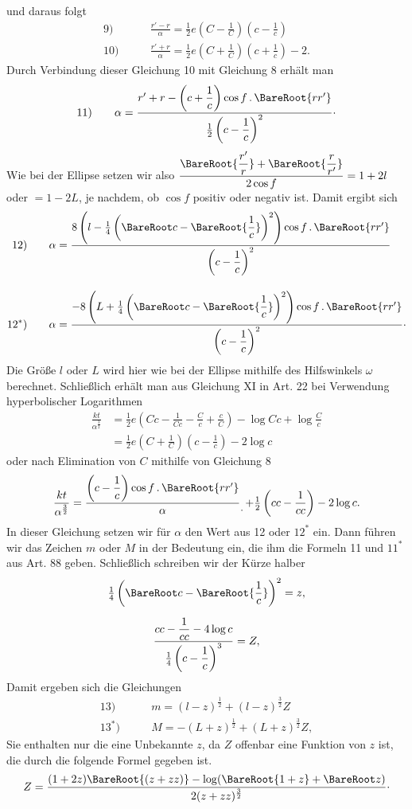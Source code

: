 \noindent und daraus folgt
\[
\begin{aligned}
\mathrm{9)}\qquad&\frac{r'-r}\alpha=\tfrac12e\left(C-\frac1C\right)\left(c-\frac1c\right)\\[.6em]
\mathrm{10)}\qquad&\frac{r'+r}\alpha=\tfrac12e\left(C+\frac1C\right)\left(c+\frac1c\right)-2.
\end{aligned}
\]
\noindent Durch Verbindung dieser Gleichung 10 mit Gleichung 8 erhält man
\[
\mathrm{11)}\qquad\alpha=\frac{r'+r-\left(c+\dfrac1c\right)\cos f\,\mathpunct{.}\BareRoot{rr'}}{\tfrac12\left(c-\dfrac1c\right)^2}\mathpunct{\cdot}
\]
\noindent Wie bei der Ellipse setzen wir also $\dfrac{\BareRoot{\dfrac{r'}r}+\BareRoot{\dfrac r{r'}}}{2\cos f}=1+2l$ oder $=1-2L$, je nachdem, ob $\cos f$ positiv oder negativ ist. Damit ergibt sich
\[
\begin{aligned}
\mathrm{12)}\qquad&\alpha=\frac{8\left(l-\tfrac14\left(\BareRoot c-\BareRoot{\dfrac1c}\right)^2\right)\cos f\,\mathpunct{.}\BareRoot{rr'}}{\left(c-\dfrac1c\right)^2}\\[1em]
\mathrm{12^*)}\qquad&\alpha=\frac{-8\left(L+\tfrac14\left(\BareRoot c-\BareRoot{\dfrac1c}\right)^2\right)\cos f\,\mathpunct{.}\BareRoot{rr'}}{\left(c-\dfrac1c\right)^2}\mathpunct{\cdot}
\end{aligned}
\]
\noindent Die Größe $l$ oder $L$ wird hier wie bei der Ellipse mithilfe des Hilfswinkels $\omega$ berechnet. Schließlich erhält man aus Gleichung XI in Art. 22 bei Verwendung hyperbolischer Logarithmen
\[
\begin{aligned}
\frac{kt}{\alpha^{\frac32}}&=\tfrac12e\left(Cc-\frac1{Cc}-\frac Cc+\frac cC\right)-\log Cc+\log\frac Cc\\[.6em]
&=\tfrac12e\left(C+\frac1C\right)\left(c-\frac1c\right)-2\log c
\end{aligned}
\]
\noindent oder nach Elimination von $C$ mithilfe von Gleichung 8
\[
\frac{kt}{\alpha^{\frac32}}=\frac{\left(c-\dfrac1c\right)\cos f\,\mathpunct{.}\BareRoot{rr'}}\alpha\mathpunct{\raisebox{-1ex}{.}}+\tfrac12\left(cc-\frac1{cc}\right)-2\log c.
\]
\noindent In dieser Gleichung setzen wir für $\alpha$ den Wert aus 12 oder $12^*$ ein. Dann führen wir das Zeichen $m$ oder $M$ in der Bedeutung ein, die ihm die Formeln 11 und $11^*$ aus Art. 88 geben. Schließlich schreiben wir der Kürze halber
\[
\begin{gathered}
\tfrac14\left(\BareRoot c-\BareRoot{\frac1c}\right)^2=z,\\[.6em]
\frac{cc-\dfrac1{cc}-4\log c}{\tfrac14\left(c-\dfrac1c\right)^3}=Z,
\end{gathered}
\]
\noindent Damit ergeben sich die Gleichungen
\[
\begin{aligned}
\mathrm{13)}\qquad&m=(l-z)^{\frac12}+(l-z)^{\frac32}Z\\[.6em]
\mathrm{13^*)}\qquad&M=-(L+z)^{\frac12}+(L+z)^{\frac32}Z,
\end{aligned}
\]
\noindent Sie enthalten nur die eine Unbekannte $z$, da $Z$ offenbar eine Funktion von $z$ ist, die durch die folgende Formel gegeben ist.
\[
Z=\frac{(1+2z)\BareRoot{(z+zz)}-\log(\BareRoot{1+z}+\BareRoot z)}{2(z+zz)^{\frac32}}\mathpunct{\cdot}
\]

